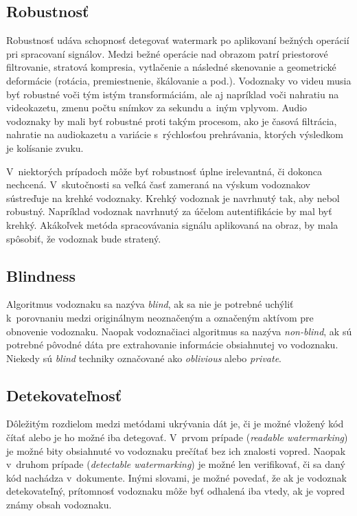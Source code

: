 \subsection{Robustnosť}
Robustnosť udáva schopnosť detegovať watermark po aplikovaní bežných operácií pri spracovaní signálov. Medzi bežné operácie nad obrazom patrí priestorové filtrovanie, stratová kompresia, vytlačenie a následné skenovanie a geometrické deformácie (rotácia, premiestnenie, škálovanie a pod.). Vodoznaky vo videu musia byť robustné voči tým istým transformáciám, ale aj napríklad voči nahratiu na videokazetu, zmenu počtu snímkov za sekundu a~iným vplyvom. Audio vodoznaky by mali byť robustné proti takým procesom, ako je časová filtrácia, nahratie na audiokazetu a variácie s~rýchlosťou prehrávania, ktorých výsledkom je kolísanie zvuku.

V~niektorých prípadoch môže byť robustnosť úplne irelevantná, či dokonca nechcená. V~skutočnosti sa veľká časť zameraná na výskum vodoznakov sústreďuje na krehké vodoznaky. Krehký vodoznak je navrhnutý tak, aby nebol robustný. Napríklad vodoznak navrhnutý za účelom autentifikácie by mal byť krehký. Akákoľvek metóda spracovávania signálu aplikovaná na obraz, by mala spôsobiť, že vodoznak bude stratený. \cite{Cox}

\subsection{Blindness}
Algoritmus vodoznaku sa nazýva {\it blind}, ak sa nie je potrebné uchýliť k~porovnaniu medzi originálnym neoznačeným a označeným aktívom pre obnovenie vodoznaku. Naopak vodoznačiaci algoritmus sa nazýva {\it non-blind}, ak sú potrebné pôvodné dáta pre extrahovanie informácie obsiahnutej vo vodoznaku. Niekedy sú {\it blind} techniky označované ako {\it oblivious} alebo {\it private}. \cite{Barni}

\subsection{Detekovateľnosť}
Dôležitým rozdielom medzi metódami ukrývania dát je, či je možné vložený kód čítať alebo je ho možné iba detegovať. V~prvom prípade ({\it readable watermarking}) je možné bity obsiahnuté vo vodoznaku prečítať bez ich znalosti vopred. Naopak v~druhom prípade ({\it detectable watermarking}) je možné len verifikovať, či sa daný kód nachádza v~dokumente. Inými slovami, je možné povedať, že ak je vodoznak detekovateľný, prítomnosť vodoznaku môže byť odhalená iba vtedy, ak je vopred známy obsah vodoznaku. \cite{Barni}

